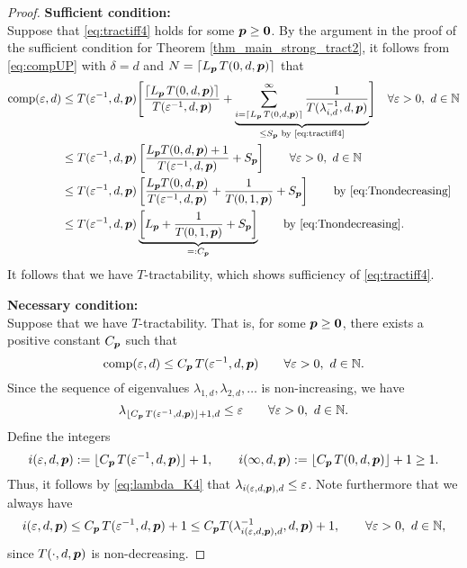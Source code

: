\documentclass[sort&compress]{elsarticle}
\newcommand{\thed}{\delta}
\begin{document}
\begin{proof}
    \textbf{Sufficient condition:}\\
Suppose that \eqref{eq:tractiff4} holds for some $\boldsymbol{p} \ge \boldsymbol{0}$.
By the argument in the proof of the sufficient condition for Theorem \ref{thm_main_strong_tract2}, it follows from \eqref{eq:compUP} with $\thed=d$ and $N = \lceil L_{\boldsymbol{p}}\, T(0,d,\boldsymbol{p})\rceil$ that
\begin{align*}
       \operatorname{comp}(\varepsilon,d)
       & \le T(\varepsilon^{-1},d,\boldsymbol{p}) \Biggl [
       \frac{\lceil L_{\boldsymbol{p}}\, T(0,d,\boldsymbol{p})\rceil}{T(\varepsilon^{-1},d,\boldsymbol{p})}  +
       \underbrace{\sum_{i=\lceil L_{\boldsymbol{p}}\, T(0,d,\boldsymbol{p})\rceil}^\infty \frac{1}{T(\lambda_{i, d}^{-1},d,\boldsymbol{p})}}_{\le S_{\boldsymbol{p}} \text{ by \eqref{eq:tractiff4}}}
       \Biggr ]
        \quad \forall \varepsilon > 0, \ d  \in \mathbb{N}\\
       & \le T(\varepsilon^{-1},d,\boldsymbol{p})\left[\frac{L_{\boldsymbol{p}} T(0,d,\boldsymbol{p})+1}{T(\varepsilon^{-1},d, \boldsymbol{p})} +  S_{\boldsymbol{p}} \right]
        \qquad \forall \varepsilon > 0, \ d  \in \mathbb{N}\\
       & \le T(\varepsilon^{-1},d,\boldsymbol{p})\left[\frac{L_{\boldsymbol{p}} T(0,d,\boldsymbol{p})}{T(\varepsilon^{-1},d, \boldsymbol{p})}
       + \frac{1}{T(0,1, \boldsymbol{p})} + S_{\boldsymbol{p}}\right]
       \qquad \text{by \eqref{eq:Tnondecreasing}}   \\
       & \le T(\varepsilon^{-1},d,\boldsymbol{p})
       \underbrace{\left [  L_{\boldsymbol{p}} + \frac{1}{T(0,1, \boldsymbol{p})} + S_{\boldsymbol{p}} \right]}_{=:C_{\boldsymbol{p}}}
       \qquad \text{by \eqref{eq:Tnondecreasing}} .
\end{align*}
It follows that we have $T$-tractability, which shows sufficiency of \eqref{eq:tractiff4}.

\bigskip

\noindent \textbf{Necessary condition:}\\
Suppose that we have
$T$-tractability. That is, for some $\boldsymbol{p} \ge \boldsymbol{0}$, there exists a positive constant $C_{\boldsymbol{p}}$ such that
\[
\operatorname{comp}(\varepsilon,d)\le C_{\boldsymbol{p}}\, T(\varepsilon^{-1},d,\boldsymbol{p}) \qquad \forall \varepsilon > 0,  \ d \in \mathbb{N}.
\]
Since the sequence of eigenvalues $\lambda_{1,d}, \lambda_{2,d}, \ldots $ is non-increasing, we have
\begin{equation}\label{eq:lambda_K4}
	\lambda_{\lfloor C_{\boldsymbol{p}}\, T(\varepsilon^{-1},d,\boldsymbol{p})\rfloor +1,d}\le \varepsilon \qquad \forall \varepsilon > 0,  \ d \in \mathbb{N}.
\end{equation}
Define the integers
\[
i (\varepsilon,d,\boldsymbol{p}):= \lfloor C_{\boldsymbol{p}}\, T(\varepsilon^{-1},d,\boldsymbol{p})\rfloor +1, \qquad
i (\infty,d,\boldsymbol{p}) := \lfloor C_{\boldsymbol{p}}\, T(0,d,\boldsymbol{p})\rfloor +1 \ge 1.
\]
Thus, it follows by \eqref{eq:lambda_K4} that $\lambda_{i(\varepsilon,d,\boldsymbol{p}),d} \le \varepsilon$.
Note furthermore that we always have
\[
i(\varepsilon,d,\boldsymbol{p})\le C_{\boldsymbol{p}}\, T(\varepsilon^{-1},d,\boldsymbol{p})+1 \le C_{\boldsymbol{p}} T(\lambda_{i(\varepsilon,d,\boldsymbol{p}),d}^{-1},d,\boldsymbol{p})+1, \qquad \forall \varepsilon > 0, \ d \in \mathbb{N},
\]
since
$T(\cdot,d,\boldsymbol{p})$ is non-decreasing.


\end{proof}
\end{document}
